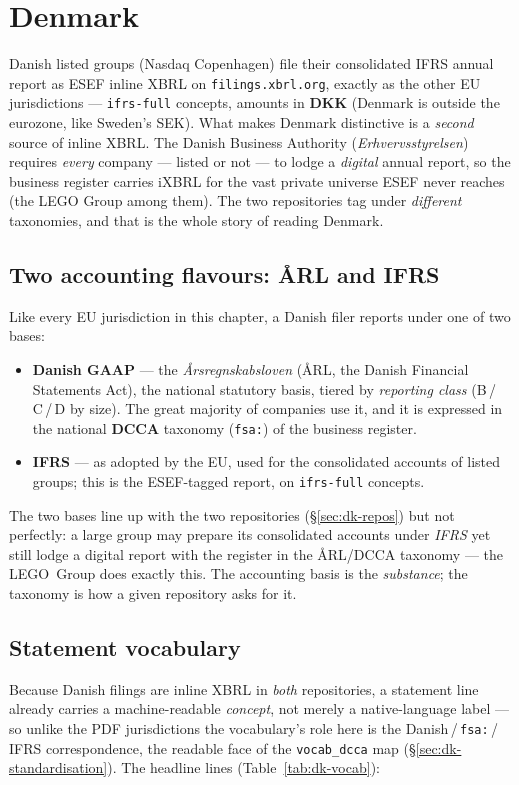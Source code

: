 \documentclass[11pt,a4paper]{report}
\begin{document}
\section{Denmark}
\label{sec:esef-denmark}

Danish listed groups (Nasdaq Copenhagen) file their consolidated IFRS annual report as ESEF inline XBRL on
\texttt{filings.xbrl.org}, exactly as the other EU jurisdictions --- \texttt{ifrs-full} concepts, amounts in
\textbf{DKK} (Denmark is outside the eurozone, like Sweden's SEK). What makes Denmark distinctive is a
\emph{second} source of inline XBRL. The Danish Business Authority (\emph{Erhvervsstyrelsen}) requires
\emph{every} company --- listed or not --- to lodge a \emph{digital} annual report, so the business register
carries iXBRL for the vast private universe ESEF never reaches (the LEGO Group among them). The two
repositories tag under \emph{different} taxonomies, and that is the whole story of reading Denmark.

\subsection{Two accounting flavours: \AA RL and IFRS}
Like every EU jurisdiction in this chapter, a Danish filer reports under one of two bases:
\begin{itemize}
  \item \textbf{Danish GAAP} --- the \emph{\AA rsregnskabsloven} (\AA RL, the Danish Financial Statements Act),
    the national statutory basis, tiered by \emph{reporting class} (B\,/\,C\,/\,D by size). The great majority
    of companies use it, and it is expressed in the national \textbf{DCCA} taxonomy (\texttt{fsa:}) of the
    business register.
  \item \textbf{IFRS} --- as adopted by the EU, used for the consolidated accounts of listed groups; this is
    the ESEF-tagged report, on \texttt{ifrs-full} concepts.
\end{itemize}
The two bases line up with the two repositories (\S\ref{sec:dk-repos}) but not perfectly: a large group may
prepare its consolidated accounts under \emph{IFRS} yet still lodge a digital report with the register in the
\AA RL/DCCA taxonomy --- the LEGO~Group does exactly this. The accounting basis is the \emph{substance}; the
taxonomy is how a given repository asks for it.

\subsection{Statement vocabulary}
Because Danish filings are inline XBRL in \emph{both} repositories, a statement line already carries a
machine-readable \emph{concept}, not merely a native-language label --- so unlike the PDF jurisdictions the
vocabulary's role here is the Danish\,/\,\texttt{fsa:}\,/\,IFRS correspondence, the readable face of the
\texttt{vocab\_dcca} map (\S\ref{sec:dk-standardisation}). The headline lines
(Table~\ref{tab:dk-vocab}):
\end{document}
